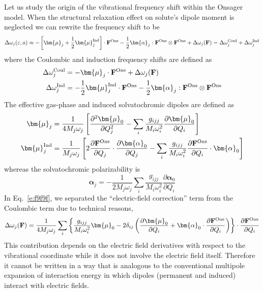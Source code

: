 \documentclass[a4paper,titlepage,twoside,fleqn,12pt]{book}
\newcommand{\BM}[1]{\bm{#1}}
\newcommand{\fderiv}[2]{\ensuremath{
    \frac{\partial #1}{\partial #2}}}
\newcommand{\sderiv}[2]{\ensuremath{
    \frac{\partial^2 #1}{\partial #2^2}
    }}
\begin{document}
\begin{refsection}
Let us study the origin of the vibrational frequency shift
within the Onsager model. 
When the structural relaxation effect on solute's dipole moment
is neglected we can rewrite the frequency shift to be
%
\begin{equation} \label{e:f9f9f}
 \Delta\omega_j(\varepsilon, a) \approx 
- \left[ {\BM \mu}_j + \frac{1}{2} {\BM \mu}_j^{\rm Ind} \right] \cdot {\bf F}^{\rm Ons} 
- \frac{1}{2} {\BM \alpha}_j : {\bf F}^{\rm Ons} \otimes {\bf F}^{\rm Ons} 
+ \Delta\omega_j({\bf F})
 = \Delta\omega_j^{\rm Coul} + \Delta\omega_j^{\rm Ind}
\end{equation}
%
where the Coulombic and induction frequency shifts 
are defined as
%
\begin{subequations}
 \begin{align}
   \Delta\omega_j^{\rm Coul}             &= - {\BM \mu}_j \cdot {\bf F}^{\rm Ons} + \Delta\omega_j({\bf F})\\
   \Delta\omega_j^{\rm Ind}              &= - \frac{1}{2} {\BM \mu}_j^{\rm Ind} \cdot {\bf F}^{\rm Ons} 
       - \frac{1}{2} {\BM \alpha}_j : {\bf F}^{\rm Ons} \otimes {\bf F}^{\rm Ons} 
 \end{align}
\end{subequations}
%
The effective gas\hyp{}phase and induced solvatochromic dipoles
are defined as
%
\begin{subequations}
 \begin{align}
   {\BM \mu}_j &= \frac{1}{4M_j\omega_j}
\left[  \sderiv{{\BM\mu}_0}{Q_j}
- \sum_i \frac{g_{ijj}}{M_i\omega_i^2} \fderiv{{\BM\mu}_0}{Q_i}
\right] \\
   {\BM \mu}_j^{\rm Ind} &= \frac{1}{M_j\omega_j} 
\left[ 2 \fderiv{{\bf F}^{\rm Ons}}{Q_j} \cdot \fderiv{{\BM\alpha}_0}{Q_j} - 
   \sum_i \frac{g_{ijj}}{M_i\omega_i^2} \fderiv{{\bf F}^{\rm Ons}}{Q_i} \cdot {\BM\alpha}_0
\right]
 \end{align}
\end{subequations}
%
whereas the solvatochromic polarizability is
%
\begin{equation} 
  {\BM \alpha}_j = - \frac{1}{2M_j\omega_j} 
   \sum_i \frac{g_{ijj}}{M_i\omega_i^2} \fderiv{{\BM\alpha}_0}{Q_i}
\end{equation}
%
In Eq.~\eqref{e:f9f9f}, we separated the ``electric\hyp{}field correction''
term from the Coulombic term due to technical reasons,
%
\begin{equation} 
\Delta\omega_j({\bf F}) = \frac{1}{4M_j\omega_j}
\sum_i \left\{ \frac{g_{ijj}}{M_i\omega_i^2}  {\BM\mu}_0 - 
2\delta_{ij} \left(
\fderiv{{\BM\mu}_0}{Q_i}
+ 
 {\BM\alpha}_0 \cdot \fderiv{{\bf F}^{\rm Ons}}{Q_i}
\right)
\right\} \cdot \fderiv{{\bf F}^{\rm Ons}}{Q_i}
\end{equation}
%
This contribution depends on the electric field derivatives with respect to the vibrational
coordinate while it does not involve the electric field itself. Therefore
it cannot be written in a way that is analogous
to the conventional multipole expansion of interaction energy 
in which dipoles (permanent and induced) interact with electric fields.


\end{refsection}
\end{document}

